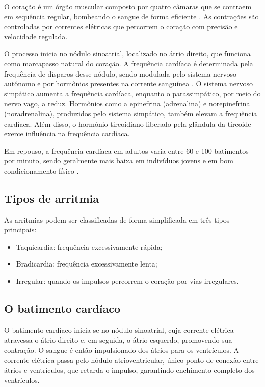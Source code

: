 \documentclass[
    12pt,                %
    openright,           %
    oneside,             %
    a4paper,             %
    brazil               %
]{abntex2}
\begin{document}
O coração é um órgão muscular composto por quatro câmaras que se contraem em sequência regular, bombeando o sangue de forma eficiente \cite{msd_ecg}. As contrações são controladas por correntes elétricas que percorrem o coração com precisão e velocidade regulada. 

O processo inicia no nódulo sinoatrial, localizado no átrio direito, que funciona como marcapasso natural do coração. A frequência cardíaca é determinada pela frequência de disparos desse nódulo, sendo modulada pelo sistema nervoso autônomo e por hormônios presentes na corrente sanguínea \cite{msd_ecg}. O sistema nervoso simpático aumenta a frequência cardíaca, enquanto o parassimpático, por meio do nervo vago, a reduz. Hormônios como a epinefrina (adrenalina) e norepinefrina (noradrenalina), produzidos pelo sistema simpático, também elevam a frequência cardíaca. Além disso, o hormônio tireoidiano liberado pela glândula da tireoide exerce influência na frequência cardíaca.

Em repouso, a frequência cardíaca em adultos varia entre 60 e 100 batimentos por minuto, sendo geralmente mais baixa em indivíduos jovens e em bom condicionamento físico \cite{msd_ecg}.

\subsection{Tipos de arritmia}

As arritmias podem ser classificadas de forma simplificada em três tipos principais:
\begin{itemize}
    \item Taquicardia: frequência excessivamente rápida;
    \item Bradicardia: frequência excessivamente lenta;
    \item Irregular: quando os impulsos percorrem o coração por vias irregulares.
\end{itemize}

\subsection{O batimento cardíaco}

O batimento cardíaco inicia-se no nódulo sinoatrial, cuja corrente elétrica atravessa o átrio direito e, em seguida, o átrio esquerdo, promovendo sua contração. O sangue é então impulsionado dos átrios para os ventrículos. A corrente elétrica passa pelo nódulo atrioventricular, único ponto de conexão entre átrios e ventrículos, que retarda o impulso, garantindo enchimento completo dos ventrículos. 
\end{document}
